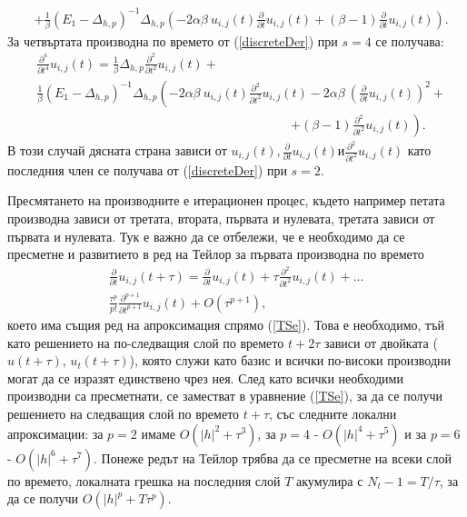 \documentclass[a4paper]{article}
\newcommand{\rf}[1]{(\ref{#1})}
\theoremstyle{remark}
\begin{document}
\begin{large}
\begin{align}
&+ \frac{1}{\beta} (E_1-\Delta_{h,p})^{-1}\Delta_{h,p} \left( -2 \alpha \beta \: u_{i, j}(t) \frac{\partial}{\partial t}u_{i, j}(t) +  (\beta-1) \frac{\partial}{\partial t} u_{i, j}(t) \right).
\end{align}
За четвъртата производна по времето от \rf{discreteDer} при $s=4$ се получава:
\begin{align} \label{der4}
&\frac{\partial^4}{\partial t^4}u_{i,j}(t) = \frac{1}{\beta}\Delta_{h,p} \frac{\partial^2}{\partial t^2}u_{i, j}(t) +   \nonumber\\
& \frac{1}{\beta}(E_1-\Delta_{h,p})^{-1}\Delta_{h,p} \left( -2 \alpha \beta \:  u_{i, j}(t)\frac{\partial^2}{\partial t^2}u_{i, j}(t) -2 \alpha \beta \: \left( \frac{\partial}{\partial t}u_{i, j}(t) \right)^2 + \right. \nonumber\\
&\quad \quad \quad \quad \quad \quad \quad \quad \quad \quad \quad \quad \quad \quad \quad \quad \quad \quad \quad \quad \left. +  (\beta-1) \frac{\partial^2}{\partial t^2} u_{i, j}(t) \right) .
\end{align}
В този случай дясната страна зависи от $u_{i, j}(t), \frac{\partial}{\partial t}u_{i, j}(t) и \frac{\partial^2}{\partial t^2}u_{i, j}(t)$ като последния член се получава от \rf{discreteDer} при $s=2$. 

Пресмятането на производните е итерационен процес, където например петата производна зависи от третата, втората, първата и нулевата, третата зависи от първата и нулевата. Тук е важно да се отбележи, че е необходимо да се пресметне и развитието в ред на Тейлор за първата производна по времето
\begin{align} \label{TSeDer}
\frac{ \partial}{ \partial t }u_{i,j}(t+\tau) = \frac{ \partial }{ \partial t }u_{i,j}(t) + \tau \frac{ \partial^2 }{ \partial t^2 }u_{i,j}(t)  + ... 
\nonumber\\
\frac{ \tau^p }{ p! } \frac{ \partial^{p+1}}{ \partial t^{p+1} }u_{i,j}(t) + O(\tau^{p+1}),
\end{align}
което има същия ред на апроксимация спрямо \rf{TSe}. Това е необходимо, тъй като решението на по-следващия слой по времето $t+2\tau$ зависи от двойката ($u(t+\tau)$, $u_t(t+\tau)$), която служи като базис и всички по-високи производни могат да се изразят единствено чрез нея. След като всички необходими производни са пресметнати, се заместват в уравнение \rf{TSe}, за да се получи решението на следващия слой по времето $t+\tau$, със следните локални апроксимации: за $p=2$ имаме $O(|h|^2 + \tau^3)$, за $p=4$ - $O(|h|^4 + \tau^5)$ и за $p=6$ - $O(|h|^6 + \tau^7)$. Понеже редът на Тейлор трябва да се пресметне на всеки слой по времето, локалната грешка на последния слой $T$ акумулира с $N_t - 1 = T/\tau$, за да се получи $O(|h|^p + T \tau^p)$.


\end{large}
\end{document}
